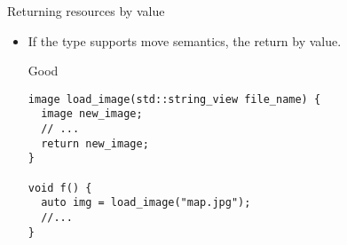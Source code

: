 \begin{frame}[t,fragile]{Returning resources by value}
\begin{itemize}
  \item If the type supports move semantics, the return by value.

\begin{block}{Good}
\begin{lstlisting}
image load_image(std::string_view file_name) {
  image new_image;
  // ...
  return new_image;
}

void f() {
  auto img = load_image("map.jpg");
  //...
} 
\end{lstlisting}
\end{block}
\end{itemize}
\end{frame}
